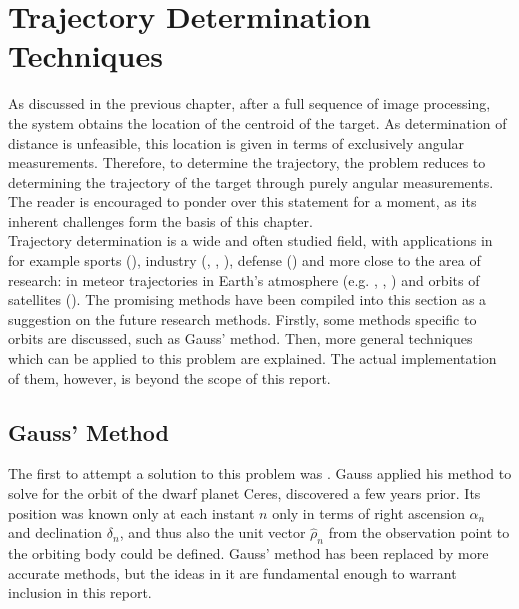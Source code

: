 \chapter{Trajectory Determination Techniques}
\label{ch:trajectory}
As discussed in the previous chapter, after a full sequence of image processing, the system obtains the location of the centroid of the target. As determination of distance is unfeasible, this location is given in terms of exclusively angular measurements. Therefore, to determine the trajectory, the problem reduces to determining the trajectory of the target through purely angular measurements. The reader is encouraged to ponder over this statement for a moment, as its inherent challenges form the basis of this chapter.\\

Trajectory determination is a wide and often studied field, with applications in for example sports (\cite{trajtwo}), industry (\cite{anntrajectoryone}, \cite{trajone}, \cite{trajthree}), defense (\cite{anntrajectoryone}) and more close to the area of research: in meteor trajectories in Earth's atmosphere (e.g. \cite{trajfour}, \cite{trajfive}, \cite{trajsix}) and orbits of satellites (\cite{phddissertation}). The promising methods have been compiled into this section as a suggestion on the future research methods. Firstly, some methods specific to orbits are discussed, such as Gauss' method. Then, more general techniques which can be applied to this problem are explained. The actual implementation of them, however, is beyond the scope of this report.

\section{Gauss' Method}
\label{sec:gaussmethod}
The first to attempt a solution to this problem was \cite{gaussceres}. Gauss applied his method to solve for the orbit of the dwarf planet Ceres, discovered a few years prior. Its position was known only at each instant $n$ only in terms of right ascension $\alpha_n$ and declination $\delta_n$, and thus also the unit vector $\hat{\rho}_n$ from the observation point to the orbiting body could be defined. Gauss' method has been replaced by more accurate methods, but the ideas in it are fundamental enough to warrant inclusion in this report. \\

